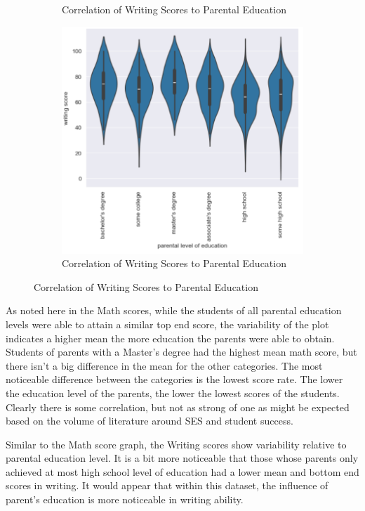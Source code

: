\documentclass[fleqn,10pt]{olplainarticle}
\begin{document}
\begin{figure}[h!]
\begin{subfigure}{0.3\textwidth}
    \caption{Correlation of Writing Scores to Parental Education}
    \label{fig:1.b}
    \end{subfigure}
    \begin{subfigure}{0.3\textwidth}
    \includegraphics[width=\linewidth]{WritingVsParent.png}
    \caption{Correlation of Writing Scores to Parental Education}
    \label{fig:1.c}
    \end{subfigure}
\end{figure}

As noted here in the Math scores, while the students of all parental education levels were able to attain a similar top end score, the variability of the plot indicates a higher mean the more education the parents were able to obtain.  Students of parents with a Master's degree had the highest mean math score, but there isn't a big difference in the mean for the other categories.  The most noticeable difference between the categories is the lowest score rate. The lower the education level of the parents, the lower the lowest scores of the students.  Clearly there is some correlation, but not as strong of one as might be expected based on the volume of literature around SES and student success.

Similar to the Math score graph, the Writing scores show variability relative to parental education level.  It is a bit more noticeable that those whose parents only achieved at most high school level of education had a lower mean and bottom end scores in writing. It would appear that within this dataset, the influence of parent's education is more noticeable in writing ability.
\end{document}
